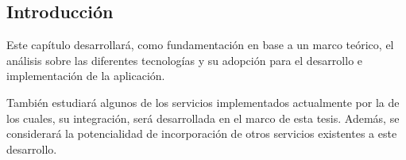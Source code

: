 \subsection{Introducción}
\label{analisis_servicios_introduccion}

Este capítulo desarrollará, como fundamentación en base a un marco teórico, el análisis sobre las diferentes tecnologías y su adopción para el desarrollo e implementación de la aplicación. 

También estudiará algunos de los servicios implementados actualmente por la \unlp{} de los cuales, su integración, será desarrollada en el marco de esta tesis. Además, se considerará la potencialidad de incorporación de otros servicios existentes a este desarrollo.